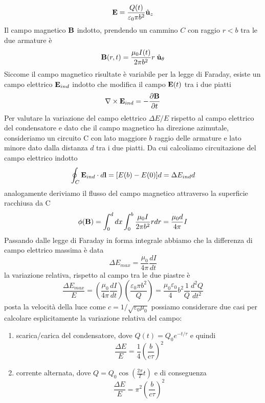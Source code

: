 \begin{equation*}
	\bold{E} = \frac{Q(t)}{\varepsilon_0 \pi b^2}\hat{\bold{u}}_z
\end{equation*}
Il campo magnetico $\bold{B}$ indotto, prendendo un cammino $C$ con raggio $r<b$ tra le due armature \`e 
\begin{equation*}
	\bold{B}(r,t) = \frac{\mu_0 I(t)}{2 \pi b^2}r \;\hat{\bold{u}}_{\theta}
\end{equation*}
Siccome il campo magnetico risultate \`e variabile per la legge di Faraday, esiste un campo elettrico $\bold{E}_{ind}$ indotto che modifica il campo $\bold{E}(t)$ tra i due piatti
\begin{equation*}
	\nabla \times \bold{E}_{ind} = - \frac{\partial \bold{B}}{\partial t}
\end{equation*}
Per valutare la variazione del campo elettrico $\Delta E/E$ rispetto al campo elettrico del condensatore  e dato che il campo magnetico ha direzione azimutale, consideriamo un circuito C con lato maggiore $b$ raggio delle armature e lato minore dato dalla distanza $d$ tra i due piatti. Da cui calcoliamo circuitazione del campo elettrico indotto
\begin{equation*}
	\oint_{C} \bold{E}_{ind} \cdot d\bold{l} = [E(b) - E(0)]d = \Delta E_{ind}d
\end{equation*}
analogamente deriviamo il flusso del campo magnetico attraverso la superficie racchiusa da C 
\begin{equation*}
	\phi(\bold{B}) = \int_{0}^{d}dx \int_{0}^{b} \frac{\mu_0 I}{2 \pi b^2}r dr = \frac{\mu_0 d }{4 \pi }I
\end{equation*}
Passando dalle legge di Faraday in forma integrale abbiamo che la differenza di campo elettrico massima \`e data 
\begin{equation*}
	\Delta E_{max} = \frac{\mu_0}{4 \pi}\frac{dI}{dt}
\end{equation*}
la variazione relativa, rispetto al campo tra le due piastre \`e 
\begin{equation*}
	\frac{\Delta E_{max}}{E} = \left(\frac{\mu_0}{4 \pi} \frac{dI}{dt}\right)\left(\frac{\varepsilon_0 \pi b^2}{Q}\right)= \frac{\mu_0 \varepsilon_0}{4}b^2 \frac{1}{Q}\frac{d^2Q}{dt^2}
\end{equation*}
posta la velocit\`a della luce come $c = 1/\sqrt{\varepsilon_0 \mu_0}$  possiamo considerare due casi per calcolare esplicitamente la variazione relativa del campo:
\begin{enumerate}
	\item scarica/carica del condensatore, dove $Q(t) = Q_0 e^{-t/\tau}$ e quindi 
	\begin{equation*}
		\frac{\Delta E}{E} = \frac{1}{4} \left(\frac{b}{c \tau}\right)^2
	\end{equation*}
	\item corrente alternata, dove $Q = Q_0 \cos \left(\frac{2\pi}{T}t\right)$ e di conseguenza
	\begin{equation*}
				\frac{\Delta E}{E} = \pi^2 \left(\frac{b}{c \tau}\right)^2
	\end{equation*}
\end{enumerate}

